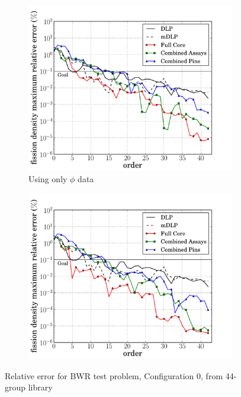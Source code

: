 \documentclass[5p,times,twocolumn,10pt]{elsarticle}
\begin{document}
    \begin{figure}[tb]
        \centering
        \begin{subfigure}{0.5\textwidth}
            \centering
            \includegraphics[trim=.1cm .25cm 2.0cm .4cm, clip=true,
            totalheight=0.261\textheight]
            {BWR0_44_energy_basis_comparison_fission-44}
            \caption{Using only $\phi$ data}
            \label{fig:core0-44a}
        \end{subfigure}%
        \begin{subfigure}{0.5\textwidth}
            \centering
            \includegraphics[trim=.1cm .25cm 2.0cm .4cm, clip=true,
            totalheight=0.261\textheight]
            {BWR0_44_partial_energy_basis_comparison_fission-44}
            \label{fig:core0-44b}
        \end{subfigure}
        \caption{Relative error for BWR test problem, Configuration 0, from
            44-group library}
        \label{fig:core0-44}
    \end{figure}
\end{document}
